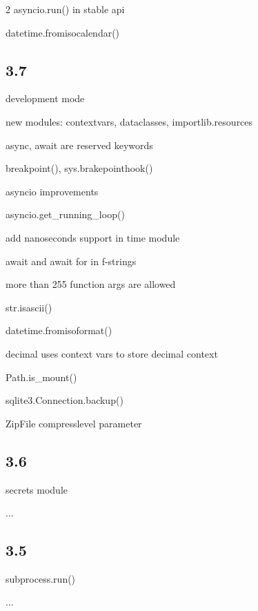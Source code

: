 \documentclass [8pt] {extarticle}
\begin{document}
\begin {multicols} {2}
    asyncio.run() in stable api

    datetime.fromisocalendar()

    \subsection {3.7}

    development mode

    new modules: contextvars, dataclasses, importlib.resources

    async, await are reserved keywords

    breakpoint(), sys.brakepointhook()

    asyncio improvements

    asyncio.get\_running\_loop()

    add nanoseconds support in time module

    await and await for in f-strings

    more than 255 function args are allowed

    str.isascii()

    datetime.fromisoformat()

    decimal uses context vars to store decimal context

    Path.is\_mount()

    sqlite3.Connection.backup()

    ZipFile compresslevel parameter

    \subsection {3.6}

    secrets module

    ...

    \subsection {3.5}

    subprocess.run()

    ...

    \end {multicols}
\end{document}
